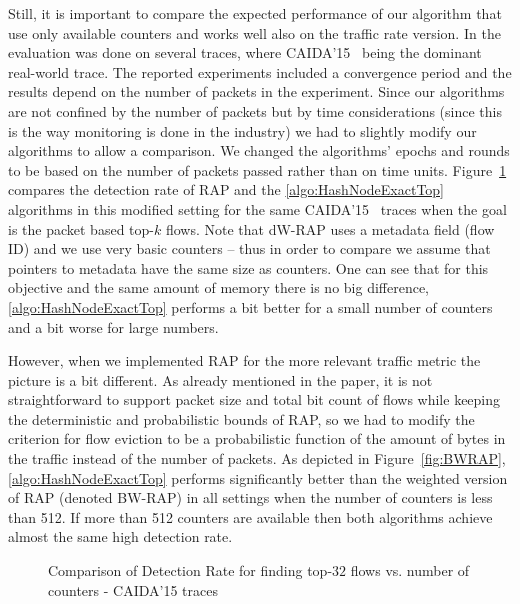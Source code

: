 Still, it is important to compare the expected performance of our algorithm that use only available counters and works well also on the traffic rate version. In \cite{Ben-Basat2017} the evaluation was done on several traces, where CAIDA’15~\cite{CAIDA15} being the dominant real-world trace. The reported experiments included a convergence period and the results depend on the number of packets in the experiment. Since our algorithms are not confined by the number of packets but by time considerations (since this is the way monitoring is done in the industry) we had to slightly modify our algorithms to allow a comparison. We changed the algorithms’ epochs and rounds to be based on the number of packets passed rather than on time units. Figure~\ref{fig:RAP} compares the detection rate of RAP and the \ref{algo:HashNodeExactTop} algorithms in this modified setting for the same CAIDA’15~\cite{CAIDA15} traces when the goal is the packet based top-$k$ flows. Note that dW-RAP uses a metadata field (flow ID) and we use very basic counters – thus in order to compare we assume that pointers to metadata have the same size as counters. One can see that for this objective and the same amount of memory there is no big difference, \ref{algo:HashNodeExactTop} performs a bit better for a small number of counters and a bit worse for large numbers. 

However, when we implemented RAP for the more relevant traffic metric the picture is a bit different.  As already mentioned in the paper, it is not straightforward to support packet size and total bit count of flows while keeping the deterministic and probabilistic bounds of RAP, so we had to modify the criterion for flow eviction to be a probabilistic function of the amount of bytes in the traffic instead of the number of packets. As depicted in Figure~\ref{fig:BWRAP}, \ref{algo:HashNodeExactTop} performs significantly better than the weighted version of RAP (denoted BW-RAP) in all settings when the number of counters is less than 512. If more than 512 counters are available then both algorithms achieve almost the same high detection rate. 

\begin{figure}
    \centering
    \caption{Comparison of Detection Rate for finding top-$32$ flows vs. number of counters - CAIDA'15 traces}
    \label{fig:RAP}

\end{figure}


